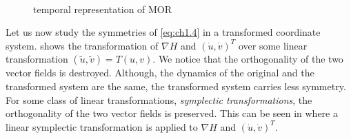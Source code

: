 \begin{figure} [t]
	\begin{centering}
	 \\
	\caption{temporal representation of MOR}
	\label{fig:ch1.2}
	\end{centering}
\end{figure}


Let us now study the symmetries of \eqref{eq:ch1.4} in a transformed coordinate system.  shows the transformation of $\nabla H$ and $(\dot u, \dot v)^T$ over some linear transformation $(\tilde u, \tilde v) = T(u,v)$. We notice that the orthogonality of the two vector fields is destroyed. Although, the dynamics of the original and the transformed system are the same, the transformed system carries less symmetry. For some class of linear transformations, \emph{symplectic transformations}, the orthogonality of the two vector fields is preserved. This can be seen in  where a linear symplectic transformation is applied to $\nabla H$ and $(\dot u, \dot v)^T$.

